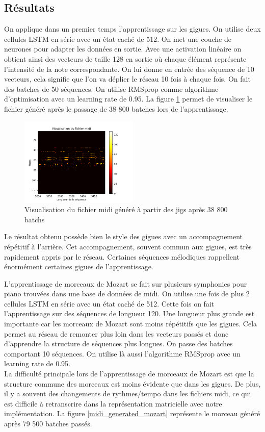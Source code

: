 \subsection{Résultats}
On applique dans un premier temps l'apprentissage sur les gigues. On utilise deux cellules LSTM en série avec un état caché de 512. On met une couche de neurones pour adapter les données en sortie. Avec une activation linéaire on obtient ainsi des vecteurs de taille 128 en sortie où chaque élément représente l'intensité de la note correspondante. On lui donne en entrée des séquence de 10 vecteurs, cela signifie que l'on va déplier le réseau 10 fois à chaque fois. On fait des batches de 50 séquences. On utilise RMSprop comme algorithme d'optimisation avec un learning rate de 0.95. La figure \ref{midi_generated_jigs} permet de visualiser le fichier généré après le passage de 38 800 batches lors de l'apprentissage.

\begin{figure}[!ht]
  \centering
  \includegraphics[width=0.5\textwidth]{images/chapter9/midi_generated_jigs_38800.png}
  \caption{Visualisation du fichier midi généré à partir des jigs après 38 800 batchs}
    \label{midi_generated_jigs}
\end{figure}
Le résultat obtenu possède bien le style des gigues avec un accompagnement répétitif à l'arrière. Cet accompagnement, souvent commun aux gigues, est très rapidement appris par le réseau. Certaines séquences mélodiques rappellent énormément certaines gigues de l'apprentissage.

\vspace{1cm}

L'apprentissage de morceaux de Mozart se fait sur plusieurs symphonies pour piano trouvées dans une base de données de midi. On utilise une fois de plus 2 cellules LSTM en série avec un état caché de 512. Cette fois on fait l'apprentissage sur des séquences de longueur 120. Une longueur plus grande est importante car les morceaux de Mozart sont moins répétitifs que les gigues. Cela permet au réseau de remonter plus loin dans les vecteurs passés et donc d'apprendre la structure de séquences plus longues. On passe des batches comportant 10 séquences. On utilise là aussi l'algorithme RMSprop avec un learning rate de 0.95. \\
La difficulté principale lors de l'apprentissage de morceaux de Mozart est que la structure commune des morceaux est moins évidente que dans les gigues. De plus, il y a souvent des changements de rythmes/tempo dans les fichiers midi, ce qui est difficile à retranscrire dans la représentation matricielle avec notre implémentation. La figure \ref{midi_generated_mozart} représente le morceau généré après 79 500 batches passés.


